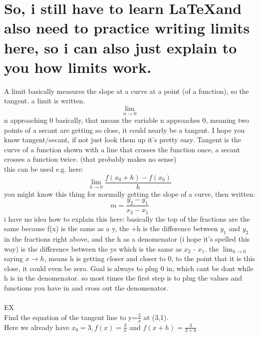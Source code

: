 \documentclass[11p]{article}
\begin{document}
\section*{So, i still have to learn \LaTeX and also need to practice writing limits
here, so i can also just explain to you how limits work.}	

A limit basically measures the slope at a curve at a point (of a function), so
the tangent. a limit is written.
\[\lim_{n \rightarrow 0}\]
n approaching 0 basically, that means the variable n approaches 0, meaning two
points of a secant are getting so close, it could nearly be a tangent. I hope
you know tangent/secant, if not just look them up it's pretty easy. Tangent is
the curve of a function shown with a line that crosses the function once, a
secant crosses a function twice. (that probably makes no sense)
\\
this can be used e.g. here:
\[\lim_{h \rightarrow 0} \frac{f(x_0+h)-f(x_0)}{h}\] 
you might know this thing for normally getting the slope of a curve, then
written:
\[m=\frac{y_2 -y_1}{x_2 -x_1}\] 
i have no idea how to explain this here: basically the top of the fractions are
the same because f(x) is the same as a y, the +h is the difference between $y_1$ 
and $y_2$ in the fractions right above, and the h as a denomenator (i hope it's
spelled this way) is the difference between the ys which is the same as $x_2$ -
$x_1$. the $\lim_{h\rightarrow 0}$ saying $x\rightarrow h$, means h is getting closer and closer to 0,
to the point that it is this close, it could even be zero.
Goal is always to plug 0 in, which cant be dont while h is in the denomenator.
so most times the first step is to plug the values and functions you have in and
cross out the denomenator.
\\
\\
\Large{EX}\\
\normalsize
Find the equation of the tangent line to y=$\frac{3}{x}$ at (3,1).\\
Here we already have $x_0=3, f(x)=\frac{3}{x}$ and $f(x+h)=\frac{3}{3+h}$ 
\end{document}
